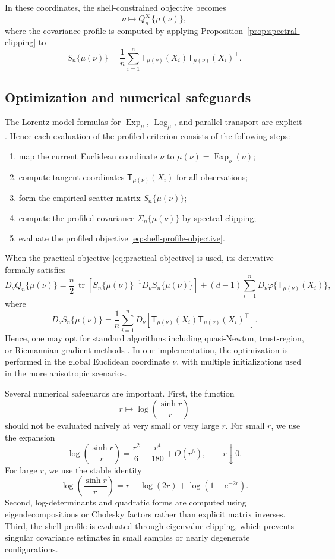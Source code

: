 \documentclass[11pt]{article}
\DeclareMathOperator{\tr}{tr}
\newcommand{\Exp}{\operatorname{Exp}}
\newcommand{\Log}{\operatorname{Log}}
\newcommand{\shell}{\mathcal{K}}
\newcommand{\psiwrap}{\varphi}
\newcommand{\T}{\mathsf{T}}
\begin{document}
In these coordinates, the shell-constrained objective becomes
\[
\nu\mapsto Q_n^{\shell}\{\mu(\nu)\},
\]
where the covariance profile is computed by applying Proposition~\ref{prop:spectral-clipping} to
\[
S_n\{\mu(\nu)\}
=
\frac1n\sum_{i=1}^n
\T_{\mu(\nu)}(X_i)\T_{\mu(\nu)}(X_i)^\top .
\]


\subsection{Optimization and numerical safeguards}

The Lorentz-model formulas for $\Exp_\mu$, $\Log_\mu$, and parallel transport are explicit \citep{nagano_2019_WrappedNormalDistribution}. Hence each evaluation of the profiled criterion consists of the following steps:
\begin{enumerate}[label=(\roman*)]
\item map the current Euclidean coordinate $\nu$ to $\mu(\nu)=\Exp_o(\nu)$;
\item compute tangent coordinates $\T_{\mu(\nu)}(X_i)$ for all observations;
\item form the empirical scatter matrix $S_n\{\mu(\nu)\}$;
\item compute the profiled covariance $\widetilde\Sigma_n\{\mu(\nu)\}$ by spectral clipping;
\item evaluate the profiled objective \eqref{eq:shell-profile-objective}.
\end{enumerate}

When the practical objective \eqref{eq:practical-objective} is used, its derivative formally satisfies
\[
D_\nu Q_n\{\mu(\nu)\}
=
\frac n2\,
\tr\!\left[
S_n\{\mu(\nu)\}^{-1}
D_\nu S_n\{\mu(\nu)\}
\right]
+
(d-1)\sum_{i=1}^n
D_\nu \psiwrap\{\T_{\mu(\nu)}(X_i)\},
\]
where
\[
D_\nu S_n\{\mu(\nu)\}
=
\frac1n\sum_{i=1}^n
D_\nu
\left[
\T_{\mu(\nu)}(X_i)\T_{\mu(\nu)}(X_i)^\top
\right].
\]
Hence, one may opt for standard algorithms including  quasi-Newton, trust-region, or Riemannian-gradient methods \citep{absil_2008_OptimizationAlgorithmsMatrix}. In our implementation, the optimization is performed in the global Euclidean coordinate $\nu$, with multiple initializations used in the more anisotropic scenarios.

Several numerical safeguards are important. First, the function
\[
r\mapsto \log\left(\frac{\sinh r}{r}\right)
\]
should not be evaluated naively at very small or very large $r$. For small $r$, we use the expansion
\[
\log\left(\frac{\sinh r}{r}\right)
=
\frac{r^2}{6}-\frac{r^4}{180}+O(r^6),
\qquad r\downarrow 0.
\]
For large $r$, we use the stable identity
\[
\log\left(\frac{\sinh r}{r}\right)
=
r-\log(2r)+\log(1-e^{-2r}).
\]
Second, log-determinants and quadratic forms are computed using eigendecompositions or Cholesky factors rather than explicit matrix inverses. Third, the shell profile is evaluated through eigenvalue clipping, which prevents singular covariance estimates in small samples or nearly degenerate configurations.
\end{document}
